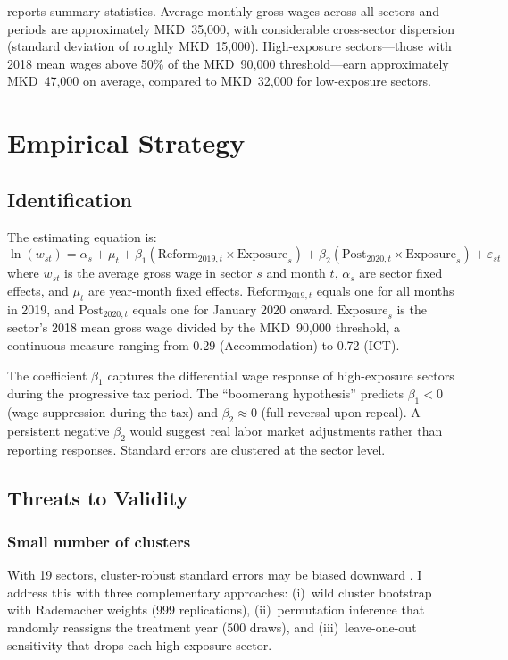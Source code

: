 \documentclass[12pt]{article}
\begin{document}


 reports summary statistics. Average monthly gross wages across all sectors and periods are approximately MKD~35,000, with considerable cross-sector dispersion (standard deviation of roughly MKD~15,000). High-exposure sectors---those with 2018 mean wages above 50\% of the MKD~90,000 threshold---earn approximately MKD~47,000 on average, compared to MKD~32,000 for low-exposure sectors.

\section{Empirical Strategy}

\subsection{Identification}

The estimating equation is:
\begin{equation}
\ln(w_{st}) = \alpha_s + \mu_t + \beta_1 (\text{Reform}_{2019,t} \times \text{Exposure}_s) + \beta_2 (\text{Post}_{2020,t} \times \text{Exposure}_s) + \varepsilon_{st}
\label{eq:main}
\end{equation}
where $w_{st}$ is the average gross wage in sector $s$ and month $t$, $\alpha_s$ are sector fixed effects, and $\mu_t$ are year-month fixed effects. $\text{Reform}_{2019,t}$ equals one for all months in 2019, and $\text{Post}_{2020,t}$ equals one for January 2020 onward. $\text{Exposure}_s$ is the sector's 2018 mean gross wage divided by the MKD~90,000 threshold, a continuous measure ranging from 0.29 (Accommodation) to 0.72 (ICT).

The coefficient $\beta_1$ captures the differential wage response of high-exposure sectors during the progressive tax period. The ``boomerang hypothesis'' predicts $\beta_1 < 0$ (wage suppression during the tax) and $\beta_2 \approx 0$ (full reversal upon repeal). A persistent negative $\beta_2$ would suggest real labor market adjustments rather than reporting responses. Standard errors are clustered at the sector level.

\subsection{Threats to Validity}

\subsubsection*{Small number of clusters} With 19 sectors, cluster-robust standard errors may be biased downward \citep{cameron2008bootstrap}. I address this with three complementary approaches: (i)~wild cluster bootstrap with Rademacher weights (999 replications), (ii)~permutation inference that randomly reassigns the treatment year (500 draws), and (iii)~leave-one-out sensitivity that drops each high-exposure sector.
\end{document}
